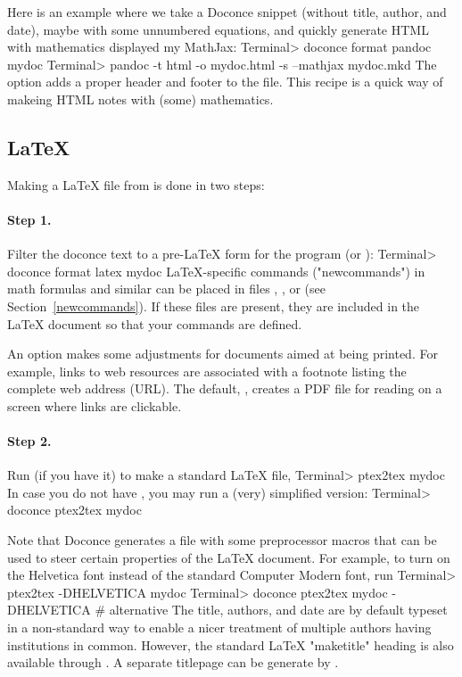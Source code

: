 \documentclass[%
oneside,                 %
final,                   %
10pt]{article}
\begin{document}
Here is an example where we take a Doconce snippet (without title, author,
and date), maybe with some unnumbered equations, and quickly generate
HTML with mathematics displayed my MathJax:
\bsys
Terminal> doconce format pandoc mydoc
Terminal> pandoc -t html -o mydoc.html -s --mathjax mydoc.mkd
\esys
The  option adds a proper header and footer to the  file.
This recipe is a quick way of makeing HTML notes with (some) mathematics.


\subsection{{\LaTeX}}

Making a {\LaTeX} file  from  is done in two steps:

\paragraph{Step 1.}
Filter the doconce text to a pre-LaTeX form  for
the  program (or ):
\bsys
Terminal> doconce format latex mydoc
\esys
LaTeX-specific commands ("newcommands") in math formulas and similar
can be placed in files , , or
 (see Section~\ref{newcommands}).
If these files are present, they are included in the {\LaTeX} document
so that your commands are defined.

An option  makes some adjustments for documents
aimed at being printed. For example, links to web resources are
associated with a footnote listing the complete web address (URL).
The default, , creates a PDF file for reading
on a screen where links are clickable.

\paragraph{Step 2.}
Run  (if you have it) to make a standard {\LaTeX} file,
\bsys
Terminal> ptex2tex mydoc
\esys
In case you do not have , you may run a (very) simplified version:
\bsys
Terminal> doconce ptex2tex mydoc
\esys

Note that Doconce generates a  file with some preprocessor macros
that can be used to steer certain properties of the {\LaTeX} document.
For example, to turn on the Helvetica font instead of the standard
Computer Modern font, run
\bsys
Terminal> ptex2tex -DHELVETICA mydoc
Terminal> doconce ptex2tex mydoc -DHELVETICA  # alternative
\esys
The title, authors, and date are by default typeset in a non-standard
way to enable a nicer treatment of multiple authors having
institutions in common. However, the standard {\LaTeX} "maketitle" heading
is also available through .
A separate titlepage can be generate by
.
\end{document}
